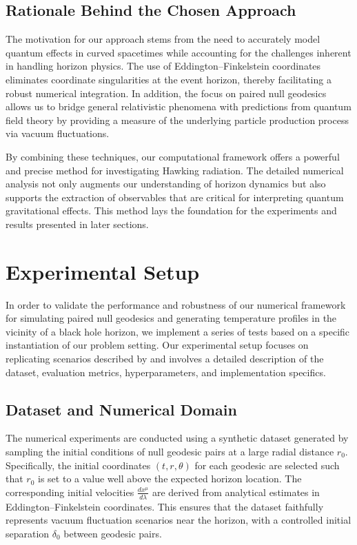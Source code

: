 \documentclass{article}\usepackage[utf8]{inputenc} %
\begin{document}
\subsection{Rationale Behind the Chosen Approach}
The motivation for our approach stems from the need to accurately model quantum effects in curved spacetimes while accounting for the challenges inherent in handling horizon physics. The use of Eddington–Finkelstein coordinates eliminates coordinate singularities at the event horizon, thereby facilitating a robust numerical integration. In addition, the focus on paired null geodesics allows us to bridge general relativistic phenomena with predictions from quantum field theory by providing a measure of the underlying particle production process via vacuum fluctuations.

By combining these techniques, our computational framework offers a powerful and precise method for investigating Hawking radiation. The detailed numerical analysis not only augments our understanding of horizon dynamics but also supports the extraction of observables that are critical for interpreting quantum gravitational effects. This method lays the foundation for the experiments and results presented in later sections.

\section{Experimental Setup}
In order to validate the performance and robustness of our numerical framework for simulating paired null geodesics and generating temperature profiles in the vicinity of a black hole horizon, we implement a series of tests based on a specific instantiation of our problem setting. Our experimental setup focuses on replicating scenarios described by \cite{Hawking1975,Jacobson1993,Unruh1976} and involves a detailed description of the dataset, evaluation metrics, hyperparameters, and implementation specifics.

\subsection{Dataset and Numerical Domain}
The numerical experiments are conducted using a synthetic dataset generated by sampling the initial conditions of null geodesic pairs at a large radial distance $r_{0}$. Specifically, the initial coordinates $(t, r, \theta)$ for each geodesic are selected such that $r_{0}$ is set to a value well above the expected horizon location. The corresponding initial velocities $\frac{dx^{\mu}}{d\lambda}$ are derived from analytical estimates in Eddington--Finkelstein coordinates. This ensures that the dataset faithfully represents vacuum fluctuation scenarios near the horizon, with a controlled initial separation $\delta_{0}$ between geodesic pairs.
\end{document}
